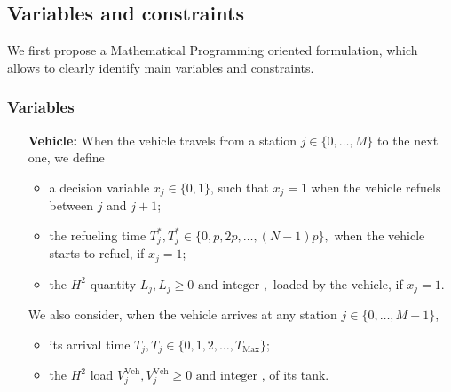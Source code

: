 \documentclass[11pt]{article}
\theoremstyle{plain}%
\theoremstyle{definition} \newtheorem{lem}{Lemma}[section]
\theoremstyle{definition} \newtheorem{claim}{Claim}[lem]
\theoremstyle{definition} \newtheorem{theorem}{Theorem}[section]
\theoremstyle{definition} \newtheorem{exo}{Exercice n$^\circ$}
\theoremstyle{definition} \newtheorem{quest}{}[exo]
\theoremstyle{definition} \newtheorem{sousquest}{}[quest]
\theoremstyle{remark}
\theoremstyle{definition}
\begin{document}
\subsection{Variables and constraints}
We first propose a Mathematical Programming oriented formulation, which allows to clearly identify main variables and constraints.

\subsubsection{Variables}

\begin{enumerate} 
\item [\bf Vehicle:]
When the vehicle travels from a station  $j \in \{  0,\ldots, M \} $ to the next one, we define
\begin{itemize}
\item  a decision variable $x_j \in \{0,1\}$,  such that $x_j = 1$ when the vehicle refuels between $j$ and $j+1$;
\item the refueling time $T^*_j, T^*_j \in \{ 0, p, 2p, \ldots, (N-1)p \}, $  when the vehicle starts to refuel, if $x_j = 1$;
\item the $H^2$ quantity  $L_j, L_j \geq 0 \textrm{ and integer }, $ loaded by the vehicle, if $x_j = 1$.
\end{itemize}
We also consider, when the vehicle arrives at  any station $j \in \{  0,\ldots, M +1 \} $,
\begin{itemize}
\item its arrival time $T_j, T_j  \in \{ 0, 1, 2, \ldots, T_{\textrm{Max}} \}$;
\item the $H^2$ load $V^{\textrm{Veh}}_j, V^{\textrm{Veh}}_j  \geq 0 \textrm{ and integer }$, of its tank.
\end{itemize}


\end{enumerate}
\end{document}
